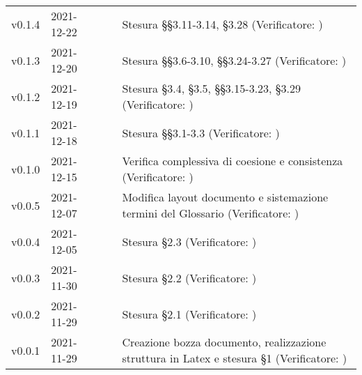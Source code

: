 \begin{longtable}{ m{}<{\centering}  m{}<{\centering}  m{}<{\centering}  m{}<{\centering}  m{}<{\centering} }
	v0.1.4 & 2021-12-22 & \LW{} & \AN{} & Stesura §§3.11-3.14, §3.28 (Verificatore: \textit{\PV})\\	

	v0.1.3 & 2021-12-20 & \FP{} & \AN{} & Stesura §§3.6-3.10, §§3.24-3.27 (Verificatore: \textit{\PV})\\	
	
	v0.1.2 & 2021-12-19 & \GC{} & \AN{} & Stesura §3.4, §3.5, §§3.15-3.23, §3.29 (Verificatore: \textit{\PV})\\	

	v0.1.1 & 2021-12-18 & \FP{} & \AN{} & Stesura §§3.1-3.3 (Verificatore: \textit{\PV})\\	

	v0.1.0 & 2021-12-15 & \FP{} & \AN{} & Verifica complessiva di coesione e consistenza (Verificatore: \textit{\PV})\\
	
	v0.0.5& 2021-12-07 & \GC{} & \AN{} & Modifica layout documento e sistemazione termini del Glossario (Verificatore: \textit{\PV{}})\\

	v0.0.4& 2021-12-05 & \LW{} & \AN{} & Stesura §2.3 (Verificatore: \textit{\PV{}})\\

	v0.0.3& 2021-11-30 & \GC & \AN{} & Stesura §2.2 (Verificatore: \textit{\PV{}})\\

	v0.0.2& 2021-11-29 & \FP{} & \AN{} & Stesura §2.1 (Verificatore: \textit{\PV{}})\\

	v0.0.1& 2021-11-29 & \LW{} & \AN{} & Creazione bozza documento, realizzazione struttura in Latex e stesura §1 (Verificatore: \textit{\PV{}})\\

\end{longtable}

\pagebreak